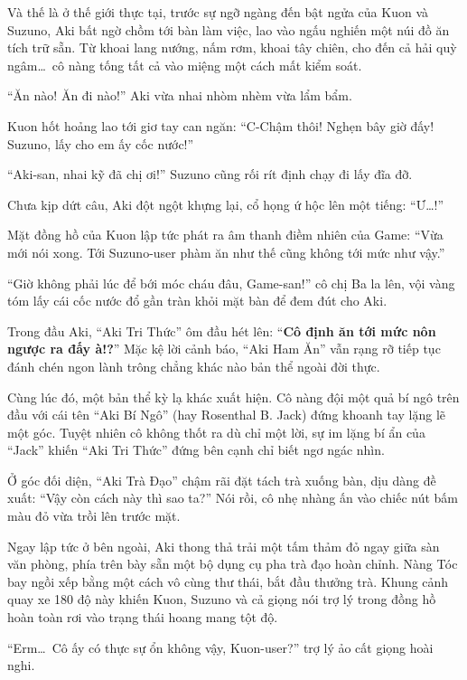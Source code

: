 \documentclass[../main.tex]{subfiles}
\begin{document}
Và thế là ở thế giới thực tại, trước sự ngỡ ngàng đến bật ngửa của Kuon và Suzuno, Aki bất ngờ chồm tới bàn làm việc, lao vào ngấu nghiến một núi đồ ăn tích trữ sẵn. Từ khoai lang nướng, nấm rơm, khoai tây chiên, cho đến cả hải quỳ ngâm\dots\ cô nàng tống tất cả vào miệng một cách mất kiểm soát.


``Ăn nào! Ăn đi nào!'' Aki vừa nhai nhòm nhèm vừa lẩm bẩm.

Kuon hốt hoảng lao tới giơ tay can ngăn: ``C-Chậm thôi! Nghẹn bây giờ đấy! Suzuno, lấy cho em ấy cốc nước!''

``Aki-san, nhai kỹ đã chị ơi!'' Suzuno cũng rối rít định chạy đi lấy đĩa đỡ.

Chưa kịp dứt câu, Aki đột ngột khựng lại, cổ họng ứ hộc lên một tiếng: ``Ư\dots!''

Mặt đồng hồ của Kuon lập tức phát ra âm thanh điềm nhiên của Game: ``Vừa mới nói xong. Tới Suzuno-user phàm ăn như thế cũng không tới mức như vậy.''

``Giờ không phải lúc để bới móc cháu đâu, Game-san!'' cô chị Ba la lên, vội vàng tóm lấy cái cốc nước đổ gần tràn khỏi mặt bàn để đem đút cho Aki.

Trong đầu Aki, ``Aki Tri Thức'' ôm đầu hét lên: ``\textbf{Cô định ăn tới mức nôn ngược ra đấy à!?}'' Mặc kệ lời cảnh báo, ``Aki Ham Ăn'' vẫn rạng rỡ tiếp tục đánh chén ngon lành trông chẳng khác nào bản thể ngoài đời thực.

Cùng lúc đó, một bản thể kỳ lạ khác xuất hiện. Cô nàng đội một quả bí ngô trên đầu với cái tên ``Aki Bí Ngô'' (hay Rosenthal B. Jack) đứng khoanh tay lặng lẽ một góc. Tuyệt nhiên cô không thốt ra dù chỉ một lời, sự im lặng bí ẩn của ``Jack'' khiến ``Aki Tri Thức'' đứng bên cạnh chỉ biết ngơ ngác nhìn.

Ở góc đối diện, ``Aki Trà Đạo'' chậm rãi đặt tách trà xuống bàn, dịu dàng đề xuất: ``Vậy còn cách này thì sao ta?'' Nói rồi, cô nhẹ nhàng ấn vào chiếc nút bấm màu đỏ vừa trồi lên trước mặt.

Ngay lập tức ở bên ngoài, Aki thong thả trải một tấm thảm đỏ ngay giữa sàn văn phòng, phía trên bày sẵn một bộ dụng cụ pha trà đạo hoàn chỉnh. Nàng Tóc bay ngồi xếp bằng một cách vô cùng thư thái, bắt đầu thưởng trà. Khung cảnh quay xe 180 độ này khiến Kuon, Suzuno và cả giọng nói trợ lý trong đồng hồ hoàn toàn rơi vào trạng thái hoang mang tột độ.


``Erm\dots\ Cô ấy có thực sự ổn không vậy, Kuon-user?'' trợ lý ảo cất giọng hoài nghi.
\end{document}
